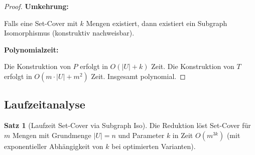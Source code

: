 ﻿\documentclass[a4paper,12pt]{article}
\theoremstyle{definition}
\newtheorem{satz}{Satz}[section]
\begin{document}
\begin{proof}
	\textbf{Umkehrung:}
	
	Falls eine Set-Cover mit $k$ Mengen existiert, dann existiert ein Subgraph Isomorphismus (konstruktiv nachweisbar).
	
	\textbf{Polynomialzeit:}
	
	Die Konstruktion von $P$ erfolgt in $O(|U| + k)$ Zeit. Die Konstruktion von $T$ erfolgt in $O(m \cdot |U| + m^2)$ Zeit. Insgesamt polynomial.
\end{proof}

\subsection{Laufzeitanalyse}

\begin{satz}[Laufzeit Set-Cover via Subgraph Iso]
	Die Reduktion löst Set-Cover für $m$ Mengen mit Grundmenge $|U| = n$ und Parameter $k$ in Zeit $O(m^{3k})$ (mit exponentieller Abhängigkeit von $k$ bei optimierten Varianten).
\end{satz}
\end{document}
